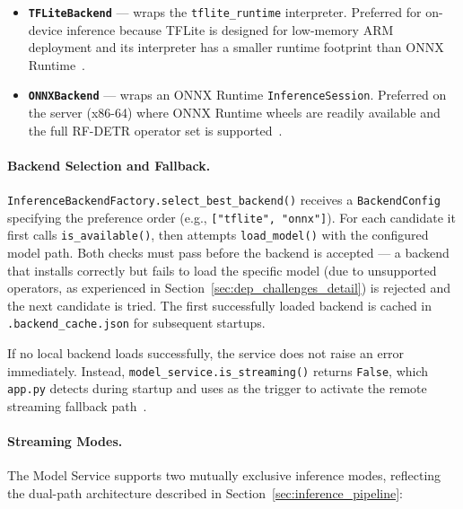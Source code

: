 \begin{itemize}
	\item \textbf{\texttt{TFLiteBackend}} — wraps the
	\texttt{tflite\_runtime} interpreter. Preferred for
	on-device inference because TFLite is designed for
	low-memory ARM deployment and its interpreter has a smaller
	runtime footprint than ONNX Runtime~\cite{david2021tensorflow}.
	
	\item \textbf{\texttt{ONNXBackend}} — wraps an ONNX Runtime
	\texttt{InferenceSession}. Preferred on the server (x86-64)
	where ONNX Runtime wheels are readily available and the
	full RF-DETR operator set is
	supported~\cite{onnxruntime2023}.
\end{itemize}

\paragraph{Backend Selection and Fallback.}

\texttt{InferenceBackendFactory.select\_best\_backend()} receives a
\texttt{BackendConfig} specifying the preference order (e.g.,
\texttt{["tflite", "onnx"]}). For each candidate it first calls
\texttt{is\_available()}, then attempts \texttt{load\_model()} with
the configured model path. Both checks must pass before the backend
is accepted — a backend that installs correctly but fails to load
the specific model (due to unsupported operators, as experienced in
Section~\ref{sec:dep_challenges_detail}) is rejected and the next
candidate is tried. The first successfully loaded backend is cached
in \texttt{.backend\_cache.json} for subsequent startups.

If no local backend loads successfully, the service does not raise an
error immediately. Instead, \texttt{model\_service.is\_streaming()}
returns \texttt{False}, which \texttt{app.py} detects during startup
and uses as the trigger to activate the remote streaming fallback
path~\cite{warden2019tinyml}.

\paragraph{Streaming Modes.}

The Model Service supports two mutually exclusive inference modes,
reflecting the dual-path architecture described in
Section~\ref{sec:inference_pipeline}:

